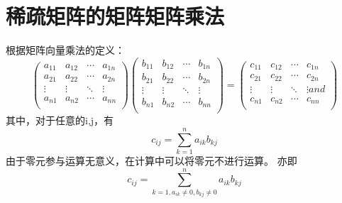 \section{稀疏矩阵的矩阵矩阵乘法}
根据矩阵向量乘法的定义：
$$
\left (                 
\begin{array}{cccc}   
    a_{11} & a_{12}& \cdots & a_{1n}\\  
    a_{21} & a_{22}& \cdots & a_{2n}\\  
     \vdots & \vdots& \ddots  & \vdots \\ 
    a_{n1} & a_{n2}& \cdots & a_{nn}\\     
\end{array}
\right)          
\left (                 
\begin{array}{cccc}   
     b_{11} & b_{12}& \cdots & b_{1n}\\  
    b_{21} & b_{22}& \cdots & b_{2n}\\  
     \vdots & \vdots& \ddots  & \vdots \\ 
    b_{n1} & b_{n2}& \cdots & b_{nn}\\ 
    \end{array}
\right)           
=
\left (                 
\begin{array}{cccc}   
     c_{11} & c_{12}& \cdots & c_{1n}\\  
    c_{21} & c_{22}& \cdots & c_{2n}\\  
     \vdots & \vdots& \ddots  & \vdots and\\ 
    c_{n1} & c_{n2}& \cdots & c_{nn}\\ 
\end{array}
\right)   
$$
其中，对于任意的i,j，有$$
c_{ij}=\sum_{k=1}^na_{ik}b_{kj}
$$
由于零元参与运算无意义，在计算中可以将零元不进行运算。
亦即$$
c_{ij}=\sum_{k=1,a_{ik}\neq 0,b_{kj} \neq 0}^na_{ik}b_{kj}
$$

